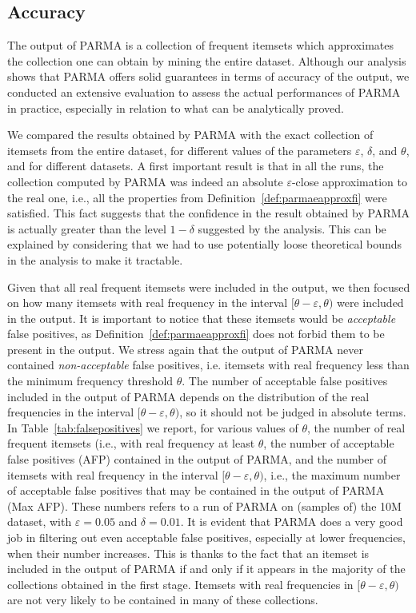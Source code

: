 \subsection{Accuracy}
The output of PARMA is a collection of frequent itemsets which approximates the
collection one can obtain by mining the entire dataset. Although our analysis
shows that PARMA offers solid guarantees in terms of accuracy of the output, we
conducted an extensive evaluation to assess the actual performances of PARMA in
practice, especially in relation to what can be analytically proved.

We compared the results obtained by PARMA with the exact collection of
itemsets from the entire dataset, for different values of the parameters
$\varepsilon$, $\delta$, and $\theta$, and for different datasets. A first important
result is that in all the runs, the collection computed by PARMA was indeed an
absolute $\varepsilon$-close approximation to the real one, i.e., all the properties from
Definition~\ref{def:parmaeapproxfi} were satisfied. This fact suggests that the confidence in
the result obtained by PARMA is actually greater than the level $1-\delta$
suggested by the analysis. This can be explained by considering that we had to
use potentially loose theoretical bounds in the analysis to make it tractable. 

Given that all real frequent itemsets were included in the output, we then
focused on how many itemsets with real frequency in the interval
$[\theta-\varepsilon,\theta)$ were included in the output. It is important to
notice that these itemsets would be \emph{acceptable} false positives, as
Definition~\ref{def:parmaeapproxfi} does not forbid them to be present in the output.
We stress again that the output of PARMA never contained \emph{non-acceptable}
false positives, i.e. itemsets with real frequency less than the minimum
frequency threshold $\theta$. The number of acceptable false positives included in the
output of PARMA depends on the distribution of the real frequencies in the
interval $[\theta-\varepsilon,\theta)$, so it should not be judged in absolute
terms. In Table~\ref{tab:falsepositives} we report, for various values of
$\theta$, the number of real frequent itemsets (i.e., with real frequency at
least $\theta$, the number of acceptable false positives (AFP) contained in the output
of PARMA, and the number of itemsets with real frequency in the interval
$[\theta-\varepsilon,\theta)$, i.e., the maximum number of acceptable false
positives that may be contained in the output of PARMA (Max AFP). These numbers
refers to a run of PARMA on (samples of) the 10M dataset, with
$\varepsilon=0.05$ and $\delta=0.01$. It is evident that PARMA does a very good
job in filtering out even acceptable false positives, especially at lower
frequencies, when their number increases. This is thanks to the fact that  an
itemset is included in the output of PARMA if and only if it appears in the
majority of the collections obtained in the first stage. Itemsets with real frequencies
in $[\theta-\varepsilon,\theta)$ are not very likely to be contained in many of
these collections.

